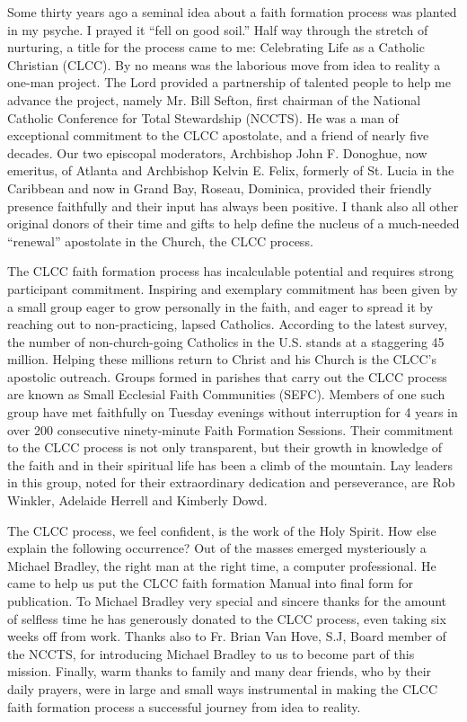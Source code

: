 \documentclass[oneside]{book}
\begin{document}
Some thirty years ago a seminal idea about a faith formation process was planted
in my psyche. I prayed it ``fell on good soil.'' Half way through the stretch of
nurturing, a title for the process came to me: Celebrating Life as a Catholic
Christian (CLCC). By no means was the laborious move from idea to reality a
one-man project. The Lord provided a partnership of talented people to help me
advance the project, namely Mr. Bill Sefton, first chairman of the National
Catholic Conference for Total Stewardship (NCCTS). He was a man of exceptional
commitment to the CLCC apostolate, and a friend of nearly five decades. Our two
episcopal moderators, Archbishop John F. Donoghue, now emeritus, of Atlanta and
Archbishop Kelvin E. Felix, formerly of St. Lucia in the Caribbean and now in
Grand Bay, Roseau, Dominica, provided their friendly presence faithfully  and
their input has always been positive. I thank also all other original donors of
their time and gifts to help define the nucleus of a much-needed ``renewal''
apostolate in the Church, the CLCC process.

The CLCC faith formation process has incalculable potential and requires strong
participant commitment. Inspiring and exemplary commitment has been given by a
small group eager to grow personally in the faith, and eager to spread it by
reaching out to non-practicing, lapsed Catholics. According to the latest
survey, the number of non-church-going Catholics in the U.S. stands at a
staggering 45 million. Helping these millions return to Christ and his Church is
the CLCC's apostolic outreach. Groups formed in parishes that carry out the CLCC
process are known as Small Ecclesial Faith Communities (SEFC). Members of one
such group have met faithfully on Tuesday evenings without interruption for 4
years in over 200 consecutive ninety-minute Faith Formation Sessions. Their
commitment to the CLCC process is not only transparent, but their growth in
knowledge of the faith and in their spiritual life has been a climb of the
mountain. Lay leaders in this group, noted for their extraordinary dedication
and perseverance, are Rob Winkler, Adelaide Herrell and Kimberly Dowd.

The CLCC process, we feel confident, is the work of the Holy Spirit. How else
explain the following occurrence? Out of the masses emerged mysteriously a
Michael Bradley, the right man at the right time, a computer professional. He
came to help us put the CLCC faith formation Manual into final form for
publication. To Michael Bradley very special and sincere thanks for the amount
of selfless time he has generously donated to the CLCC process, even taking six
weeks off from work. Thanks also to Fr. Brian Van Hove, S.J, Board member of the
NCCTS, for introducing Michael Bradley to us to become part of this
mission. Finally, warm thanks to family and many dear friends, who by their
daily prayers, were in large and small ways instrumental in making the CLCC
faith formation process a successful journey from idea to reality.
\end{document}
